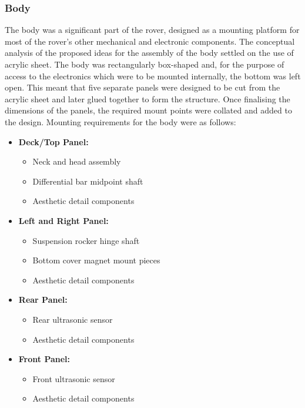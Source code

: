     \subsubsection{Body}
      The body was a significant part of the rover, designed as a mounting platform for most of the rover's other mechanical and electronic components. The conceptual analysis of the proposed ideas for the assembly of the body settled on the use of acrylic sheet. The body was rectangularly box-shaped and, for the purpose of access to the electronics which were to be mounted internally, the bottom was left open. This meant that five separate panels were designed to be cut from the acrylic sheet and later glued together to form the structure. Once finalising the dimensions of the panels, the required mount points were collated and added to the design. Mounting requirements for the body were as follows:
      
      \begin{itemize}
        \item \textbf{Deck/Top Panel:}
        \begin{itemize}
          \item Neck and head assembly
          \item Differential bar midpoint shaft
          \item Aesthetic detail components
        \end{itemize}
        \item \textbf{Left and Right Panel:}
        \begin{itemize}
          \item Suspension rocker hinge shaft
          \item Bottom cover magnet mount pieces
          \item Aesthetic detail components
        \end{itemize}
        \item \textbf{Rear Panel:}
        \begin{itemize}
          \item Rear ultrasonic sensor
          \item Aesthetic detail components
        \end{itemize}
        \item \textbf{Front Panel:}
        \begin{itemize}
          \item Front ultrasonic sensor
          \item Aesthetic detail components
        \end{itemize}
      \end{itemize}
      
